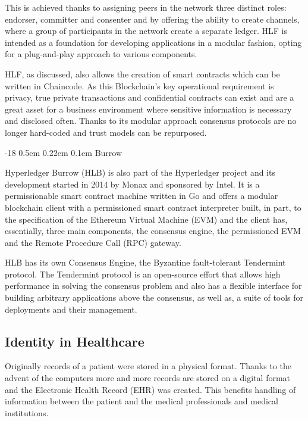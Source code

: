 \documentclass[]{llncs}
\makeatletter
\renewcommand\subsubsection{\@startsection{subsubsection}{3}{\z@}%
                       {-18\p@ \@plus -4\p@ \@minus -4\p@}%
                       {0.5em \@plus 0.22em \@minus 0.1em}%
                       {\normalfont\normalsize\bfseries\boldmath}}
\makeatother
\begin{document}
This is achieved thanks to assigning peers in the network three distinct roles: 
endorser, committer and consenter and by offering the ability to create channels, 
where a group of participants in the network create a separate ledger. 
HLF is intended as a foundation for developing applications in a modular fashion, 
opting for a plug-and-play approach to various components. \cite{HyperledgerFabricDocs2017}

HLF, as discussed, also allows the creation of smart contracts which can be written in Chaincode. 
As this Blockchain's key operational requirement is privacy, true private transactions 
and confidential contracts can exist and are a great asset for a business environment 
where sensitive information is necessary and disclosed often. 
Thanks to its modular approach consensus protocols are no longer hard-coded and 
trust models can be repurposed.

\subsubsection{Burrow}

Hyperledger Burrow (HLB) is also part of the Hyperledger project and its development 
started in 2014 by Monax and sponsored by Intel. It is a permissionable smart contract machine 
written in Go and offers a modular blockchain client with a permissioned smart contract interpreter 
built, in part, to the specification of the Ethereum Virtual Machine (EVM) and the client has, 
essentially, three main components, the consensus engine, the permissioned EVM and the 
Remote Procedure Call (RPC) gateway.
\cite{Kuhlman2017,HyperledgerBurrow2017}

HLB has its own Consensus Engine, the Byzantine fault-tolerant Tendermint protocol. 
The Tendermint protocol is an open-source effort that allows high performance in 
solving the consensus problem and also has a flexible interface for building 
arbitrary applications above the consensus, as well as, a suite of tools for 
deployments and their management. \cite{Buchman2016}
%

\subsection{Identity in Healthcare}
Originally records of a patient were stored in a physical format. 
Thanks to the advent of the computers more and more records are stored on a 
digital format and the Electronic Health Record (EHR) was created. 
This benefits handling of information between the patient 
and the medical professionals and medical institutions.
\end{document}
